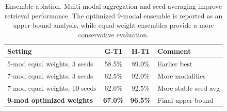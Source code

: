 \begin{table}[htbp]
\centering
\caption{Ensemble ablation. Multi-modal aggregation and seed averaging improve retrieval performance. The optimized 9-modal ensemble is reported as an upper-bound analysis, while equal-weight ensembles provide a more conservative evaluation.}
\label{tab:ensemble_ablation}
\begin{tabular}{lccl}
\toprule
\textbf{Setting} & \textbf{G-T1} & \textbf{H-T1} & \textbf{Comment} \\
\midrule
5-mod equal weights, 3 seeds & 58.5\% & 89.0\% & Earlier best \\
7-mod equal weights, 3 seeds & 62.5\% & 92.0\% & More modalities \\
7-mod equal weights, 10 seeds & 62.0\% & 92.5\% & More stable seed avg \\
\textbf{9-mod optimized weights} & \textbf{67.0\%} & \textbf{96.5\%} & Final upper-bound \\
\bottomrule
\end{tabular}
\end{table}
